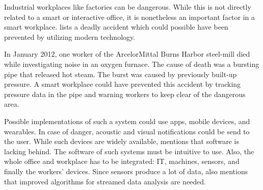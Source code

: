 Industrial workplaces like factories can be dangerous. While this is not directly related to a smart or interactive office, it is nonetheless an important factor in a smart workplace. \cite{sda-wired} lists a deadly accident which could possible have been prevented by utilizing modern technology.

In January 2012, one worker of the ArcelorMittal Burns Harbor steel-mill died while investigating noise in an oxygen furnace. The cause of death was a bursting pipe that released hot steam. The burst was caused by previously built-up pressure. A smart workplace could have prevented this accident by tracking pressure data in the pipe and warning workers to keep clear of the dangerous area.

Possible implementations of such a system could use apps, mobile devices, and wearables. In case of danger, acoustic and visual notifications could be send to the user. While such devices are widely available, \cite{sda-wired} mentions that software is lacking behind. The software of such systems must be intuitive to use. Also, the whole office and workplace has to be integrated: IT, machines, sensors, and finally the workers' devices. Since sensors produce a lot of data, \cite{sda-wired} also mentions that improved algorithms for streamed data analysis are needed.


